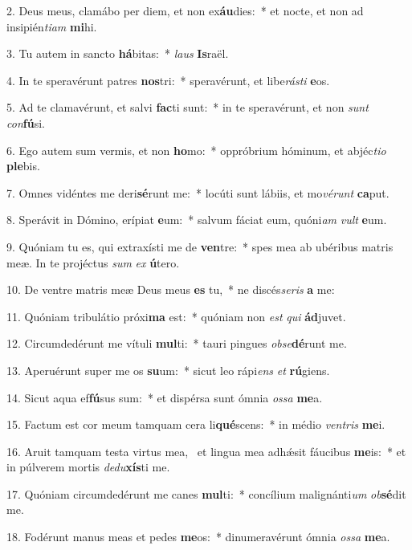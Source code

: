 2. Deus meus, clamábo per diem, et non ex\textbf{áu}dies:~*  et nocte, et non ad insipién\textit{ti}\textit{am} \textbf{mi}hi.\

3. Tu autem in sancto \textbf{há}bitas:~*  \textit{laus} \textbf{Is}raël.\

4. In te speravérunt patres \textbf{nos}tri:~*  speravérunt, et libe\textit{rás}\textit{ti} \textbf{e}os.\

5. Ad te clamavérunt, et salvi \textbf{fac}ti sunt:~*  in te speravérunt, et non \textit{sunt} \textit{con}\textbf{fú}si.\

6. Ego autem sum vermis, et non \textbf{ho}mo:~*  oppróbrium hóminum, et abjéc\textit{ti}\textit{o} \textbf{ple}bis.\

7. Omnes vidéntes me deri\textbf{sé}runt me:~*  locúti sunt lábiis, et mo\textit{vé}\textit{runt} \textbf{ca}put.\

8. Sperávit in Dómino, erípiat \textbf{e}um:~*  salvum fáciat eum, quóni\textit{am} \textit{vult} \textbf{e}um.\

9. Quóniam tu es, qui extraxísti me de \textbf{ven}tre:~*  spes mea ab ubéribus matris meæ. In te projéctus \textit{sum} \textit{ex} \textbf{ú}tero.\

10. De ventre matris meæ Deus meus \textbf{es} tu,~*  ne discés\textit{se}\textit{ris} \textbf{a} me:\

11. Quóniam tribulátio próxi\textbf{ma} est:~*  quóniam non \textit{est} \textit{qui} \textbf{ád}juvet.\

12. Circumdedérunt me vítuli \textbf{mul}ti:~*  tauri pingues \textit{ob}\textit{se}\textbf{dé}runt me.\

13. Aperuérunt super me os \textbf{su}um:~*  sicut leo rápi\textit{ens} \textit{et} \textbf{rú}giens.\

14. Sicut aqua ef\textbf{fú}sus sum:~*  et dispérsa sunt ómnia \textit{os}\textit{sa} \textbf{me}a.\

15. Factum est cor meum tamquam cera li\textbf{qué}scens:~*  in médio \textit{ven}\textit{tris} \textbf{me}i.\

16. Aruit tamquam testa virtus mea, \dag\  et lingua mea adhǽsit fáucibus \textbf{me}is:~*  et in púlverem mortis \textit{de}\textit{du}\textbf{xís}ti me.\

17. Quóniam circumdedérunt me canes \textbf{mul}ti:~*  concílium malignánti\textit{um} \textit{ob}\textbf{sé}dit me.\

18. Fodérunt manus meas et pedes \textbf{me}os:~*  dinumeravérunt ómnia \textit{os}\textit{sa} \textbf{me}a.\

